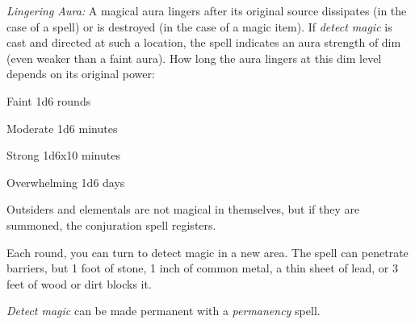 \textit{Lingering Aura:} A magical aura lingers after its original source dissipates 
(in the case of a spell) or is destroyed (in the case of a magic item). If \textit{detect 
magic} is cast and directed at such a location, the spell indicates an aura strength 
of dim (even weaker than a faint aura). How long the aura lingers at this dim level 
depends on its original power:

\begin{description*}
\item[Faint] 1d6 rounds
\item[Moderate] 1d6 minutes
\item[Strong] 1d6x10 minutes
\item[Overwhelming] 1d6 days
\end{description*}

Outsiders and elementals are not magical in themselves, but if they are summoned, 
the conjuration spell registers.

Each round, you can turn to detect magic in a new area. The spell can penetrate 
barriers, but 1 foot of stone, 1 inch of common metal, a thin sheet of lead, or 
3 feet of wood or dirt blocks it.

\textit{Detect magic} can be made permanent with a \textit{permanency} spell.


